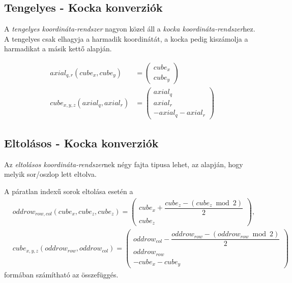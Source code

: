 \subsection{Tengelyes - Kocka konverziók}

A \textit{tengelyes koordináta-rendszer} nagyon közel áll a \textit{kocka koordináta-rendszer}hez. A tengelyes csak elhagyja a harmadik koordinátát, a kocka pedig kiszámolja a harmadikat a másik kettő alapján.


\begin{align*}
axial_{q, r}(cube_{x}, cube_{y}) &=
\left(
\begin{array}{c}
cube_{x} \\
cube_{y}
\end{array}
\right)
\\
cube_{x,y,z} (axial_{q}, axial_{r}) &=
\left(
\begin{array}{c}
axial_q \\
axial_r \\
-axial_q - axial_r
\end{array}
\right)
\end{align*}

\subsection{Eltolásos - Kocka konverziók}

Az \textit{eltolásos koordináta-rendszer}nek négy fajta tipusa lehet, az alapján, hogy melyik sor/oszlop lett eltolva.

A páratlan indexű sorok eltolása esetén a
\begin{align*}
&oddrow_{row, col}(cube_{x},cube_{z}, cube_{z}) =
\left(
\begin{array}{c}
cube_{x} + \dfrac{cube_{z} - (cube_{z} \bmod 2)}{2} \\
cube_{z}
\end{array}
\right),
\\
&cube_{x, y, z}(oddrow_{row}, oddrow_{col}) =
\left(
\begin{array}{c}
oddrow_{col} - \dfrac{oddrow_{row} - (oddrow_{row} \bmod 2)}{2} \\
oddrow_{row} \\
-cube_{x} - cube_{y}
\end{array}
\right)
\end{align*}
formában számítható az összefüggés.

